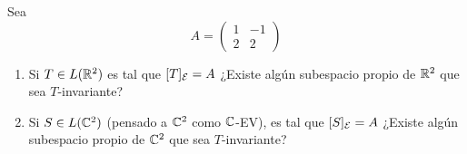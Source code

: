 \item Sea \[A=\begin{pmatrix}
        1&-1\\2&2
    \end{pmatrix}\]
    \begin{enumerate}
        \item Si $T\in L(\mathbb{R}^2)$ es tal que $[T]_{\mathcal{E}}=A$ ¿Existe algún subespacio propio de $\mathbb{R}^2$ que sea $T$-invariante?
            \begin{mdframed}[style=s]
                
            \end{mdframed}
        \item Si $S\in L(\mathbb{C}^2)$ (pensado a $\mathbb{C}^2$ como $\mathbb{C}$-EV), es tal que $[S]_{\mathcal{E}}=A$ ¿Existe algún subespacio propio de $\mathbb{C}^2$ que sea $T$-invariante?
            \begin{mdframed}[style=s]
                
            \end{mdframed}
    \end{enumerate}